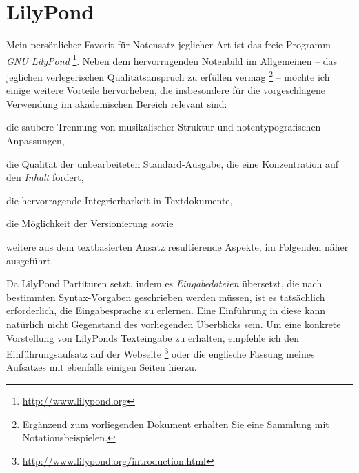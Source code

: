\documentclass[DIV=12]{scrreprt}
\begin{document}
\chapter{LilyPond}
\label{chap:pt_lilypond}
Mein persönlicher Favorit für Notensatz jeglicher Art ist das freie Programm \emph{GNU LilyPond}%
\footnote{\url{http://www.lilypond.org}}.
Neben dem hervorragenden Notenbild im Allgemeinen -- das jeglichen verlegerischen Qualitätsanspruch zu erfüllen vermag%
\footnote{Ergänzend zum vorliegenden Dokument erhalten Sie eine Sammlung mit Notationsbeispielen.}
-- möchte ich einige weitere Vorteile hervorheben, die insbesondere für die vorgeschlagene Verwendung im akademischen Bereich relevant sind:

\begin{itemize*}
\item die saubere Trennung von musikalischer Struktur und notentypografischen Anpassungen,
\item die Qualität der unbearbeiteten Standard-Ausgabe, die eine Konzentration auf den \emph{Inhalt} fördert,
\item die hervorragende Integrierbarkeit in Textdokumente,
\item die Möglichkeit der Versionierung sowie
\item weitere aus dem textbasierten Ansatz resultierende Aspekte, im Folgenden näher ausgeführt.
\end{itemize*}

Da LilyPond Partituren setzt, indem es \emph{Eingabedateien} übersetzt, die nach bestimmten Syntax-Vorgaben geschrieben werden müssen, ist es tatsächlich erforderlich, die Eingabesprache zu erlernen.
Eine Einführung in diese kann natürlich nicht Gegenstand des vorliegenden Überblicks sein.
Um eine konkrete Vorstellung von LilyPonds Texteingabe zu erhalten, empfehle ich den Einführungsaufsatz auf der Webseite%
\footnote{\url{http://www.lilypond.org/introduction.html}}
oder die englische Fassung meines Aufsatzes mit ebenfalls einigen Seiten hierzu.
\end{document}

